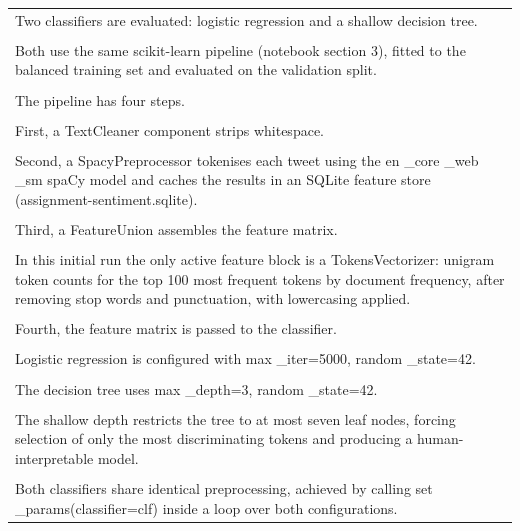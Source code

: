 \documentclass[11pt]{article}
\begin{document}
\begin{longtable}{|p{\dimexpr\linewidth-2\tabcolsep-2\arrayrulewidth\relax}|}
\hline
\rule{0pt}{3.5cm} \\
\hline
Two classifiers are evaluated: logistic regression and a shallow decision tree. \\[2pt]
\hline
\rule{0pt}{3.5cm} \\
\hline
Both use the same scikit-learn pipeline (notebook section 3), fitted to the balanced training set and evaluated on the validation split. \\[2pt]
\hline
\rule{0pt}{3.5cm} \\
\hline
The pipeline has four steps. \\[2pt]
\hline
\rule{0pt}{3.5cm} \\
\hline
First, a TextCleaner component strips whitespace. \\[2pt]
\hline
\rule{0pt}{3.5cm} \\
\hline
Second, a SpacyPreprocessor tokenises each tweet using the en \_core \_web \_sm spaCy model and caches the results in an SQLite feature store (assignment-sentiment.sqlite). \\[2pt]
\hline
\rule{0pt}{3.5cm} \\
\hline
Third, a FeatureUnion assembles the feature matrix. \\[2pt]
\hline
\rule{0pt}{3.5cm} \\
\hline
In this initial run the only active feature block is a TokensVectorizer: unigram token counts for the top 100 most frequent tokens by document frequency, after removing stop words and punctuation, with lowercasing applied. \\[2pt]
\hline
\rule{0pt}{3.5cm} \\
\hline
Fourth, the feature matrix is passed to the classifier. \\[2pt]
\hline
\rule{0pt}{3.5cm} \\
\hline
Logistic regression is configured with max \_iter=5000, random \_state=42. \\[2pt]
\hline
\rule{0pt}{3.5cm} \\
\hline
The decision tree uses max \_depth=3, random \_state=42. \\[2pt]
\hline
\rule{0pt}{3.5cm} \\
\hline
The shallow depth restricts the tree to at most seven leaf nodes, forcing selection of only the most discriminating tokens and producing a human-interpretable model. \\[2pt]
\hline
\rule{0pt}{3.5cm} \\
\hline
Both classifiers share identical preprocessing, achieved by calling set \_params(classifier=clf) inside a loop over both configurations. \\[2pt]

\end{longtable}
\end{document}
